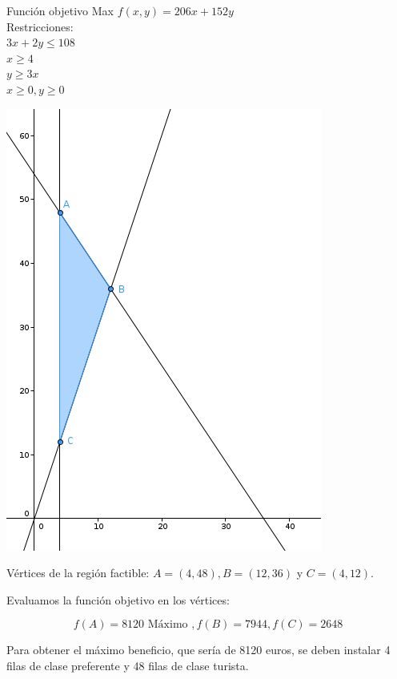 \documentclass[12pt, a4paper]{amsart}
\newcommand{\n}{\color[rgb]{0,0,0}}
\begin{document}
\hspace*{-4mm}Función objetivo Max $f(x,y)=206x+152y$\\



\hspace*{-4mm}Restricciones:\\ 
$3x+2y\leqslant 108$\\
$x\geqslant 4$\\
$y\geqslant 3x$\\
$x\geqslant 0, y\geqslant 0$

\begin{center}
\includegraphics[scale=0.5]{2007 Aerolínea.png}
\end{center}


Vértices de la región factible: $A=(4,48), B=(12,36)$ y $C=(4,12).$

Evaluamos la función objetivo en los vértices:

\[f(A)=8120 \text{ Máximo }, f(B)=7944, f(C)=2648\]

Para obtener el máximo beneficio, que sería de 8120 euros, se deben instalar 4 filas de clase preferente y 48 filas de clase turista.

\n

\vspace*{1cm}
\end{document}
